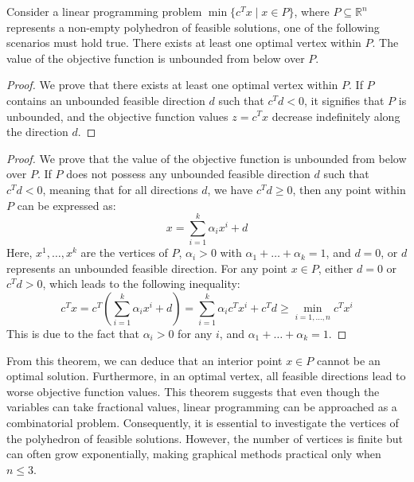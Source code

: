\begin{theorem}
    Consider a linear programming problem $\min\{c^Tx\mid x \in P\}$, where $P \subseteq \mathbb{R}^n$ represents a non-empty polyhedron of feasible solutions, one of the following scenarios must hold true.
    There exists at least one optimal vertex within $P$.
    The value of the objective function is unbounded from below over $P$.
\end{theorem}
\begin{proof}
    We prove that there exists at least one optimal vertex within $P$.
    If $P$ contains an unbounded feasible direction $d$ such that $c^Td < 0$, it signifies that $P$ is unbounded, and the objective function values $z=c^Tx$ decrease indefinitely along the direction $d$. 
\end{proof}
\begin{proof}
    We prove that the  value of the objective function is unbounded from below over $P$.
    If $P$ does not possess any unbounded feasible direction $d$ such that $c^Td < 0$, meaning that for all directions $d$, we have $c^Td \geq 0$, then any point within $P$ can be expressed as: 
    \[x=\sum_{i=1}^k{\alpha_ix^i + d}\]
    Here, $x^1,\dots,x^k$ are the vertices of $P$, $\alpha_i > 0$ with $\alpha_1+\dots+\alpha_k=1$, and $d = 0$, or $d$ represents an unbounded feasible direction.
    For any point $x \in P$, either $d = 0$ or $c^Td > 0$, which leads to the following inequality:
    \[c^Tx=c^T\left(\sum_{i=1}^{k}{\alpha_ix^i+d}\right)=\sum_{i=1}^{k}{\alpha_ic^Tx^i+c^Td}\geq\min_{i=1,\dots,n}{c^Tx^i}\]
    This is due to the fact that $\alpha_i > 0$ for any $i$, and $\alpha_1+\dots+\alpha_k=1$. 
\end{proof}
From this theorem, we can deduce that an interior point $x \in P$ cannot be an optimal solution. 
Furthermore, in an optimal vertex, all feasible directions lead to worse objective function values.
This theorem suggests that even though the variables can take fractional values, linear programming can be approached as a combinatorial problem.
Consequently, it is essential to investigate the vertices of the polyhedron of feasible solutions.
However, the number of vertices is finite but can often grow exponentially, making graphical methods practical only when $n \leq 3$. 
